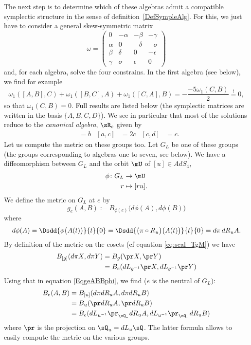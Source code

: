 The next step is to determine which of these algebras admit a compatible symplectic structure in the sense of definition~\ref{DefSympleAlg}.
For this, we just have to consider a general skew-symmetric matrix
\[
	\omega=
	\begin{pmatrix}
		0      & -\alpha & -\beta   & -\gamma   \\
		\alpha & 0       & -\delta  & -\sigma   \\
		\beta  & \delta  & 0        & -\epsilon \\
		\gamma & \sigma  & \epsilon & 0
	\end{pmatrix}
\]
and, for each algebra, solve the four constrains. In the first algebra (see below), we find for example
\[
	\omega_{1}([A,B],C)+\omega_{1}([B,C],A)+\omega_{1}([C,A],B)=-\frac{ -5\omega_{1}(C,B) }{ 2 }\stackrel{!}{=}0,
\]
so that $\omega_{1}(C,B)=0$. Full results are listed below (the symplectic matrices are written in the basis $\{ A,B,C,D \}$).  We see in particular that most of the solutions reduce to the \emph{canonical algebra}, $\sR_c$ given by
\begin{align*}
	[a,b] & =b
	      & [a,c] & =2c
	      & [c,d] & =c.
\end{align*}
Let us compute the metric on these groups too. Let $G_{L}$ be one of these groups (the groups corresponding to algebras one to seven, see below). We have a diffeomorphism between $G_{L}$ and the orbit $\mU$ of $[u]\in AdS_4$,
\begin{equation}
	\begin{aligned}
		\phi\colon G_{L} & \to \mU       \\
		r                & \mapsto [ru].
	\end{aligned}
\end{equation}
We define the metric on $G_{L}$ at $e$ by
\begin{equation}   \label{EqgeABBphi}
	g_{e}(A,B):=B_{\phi(e)}\big( d\phi(A),d\phi(B) \big)
\end{equation}
where
\[
	d\phi(A)=\Dsdd{ \phi\big( A(t) \big) }{t}{0}=\Dsdd{ \big( \pi\circ R_{u} \big)\big( A(t) \big) }{t}{0}=d\pi\,dR_{u}A.
\]
By definition of the metric on the cosets (cf equation \eqref{eq:scal_TgM}) we have
\begin{align*}
	B_{[g]}(d\pi X,d\pi Y) & =B_{g}(\pr X,\pr Y)                       \\
	                       & =B_{e}(dL_{g^{-1}}\pr X,dL_{g^{-1}}\pr Y)
\end{align*}
Using that in equation \eqref{EqgeABBphi}, we find ($e$ is the neutral of $G_{L}$):
\[
	\begin{split}
		B_{e}(A,B)&=B_{[u]}(d\pi dR_{u}A,d\pi dR_{u}B)\\
		&=B_{u}(\pr dR_{u}A,\pr dR_{u}B)\\
		&=B_{e}(dL_{u^{-1}}\pr_{\sQ_{u}}dR_{u}A,dL_{u^{-1}}\pr_{\sQ_{u}}dR_{u}B)
	\end{split}
\]
where $\pr$ is the projection on $\sQ_{u}=dL_{u}\sQ$. The latter formula allows to easily compute the metric on the various groups.

